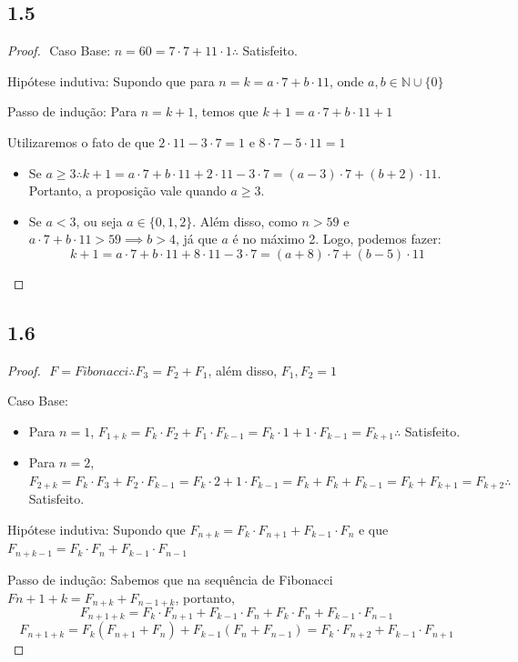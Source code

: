 \documentclass{article}
\begin{document}
\subsection*{1.5}
\begin{proof}
$ $\newline
Caso Base: $n = 60 = 7\cdot7 + 11\cdot1 \therefore$ Satisfeito. 

Hipótese indutiva: Supondo que para $n=k = a\cdot7 + b\cdot11$, onde $a,b \in \mathbb{N}\cup\{0\}$

Passo de indução: Para $n = k+1$, temos que $k+1 =a\cdot7 + b\cdot11 + 1$

Utilizaremos o fato de que $2\cdot11-3\cdot7 = 1$  e  $8\cdot7 - 5\cdot11 = 1$

\begin{itemize}

\item Se $a \geq  3 \therefore k + 1 =a\cdot7+b\cdot11+2\cdot11-3\cdot7 = (a-3)\cdot7 + (b+2)\cdot11$. Portanto,
a proposição vale quando $a \geq 3 $.

\item Se $a<3$, ou seja $a \in \{0,1,2\}$. Além disso, como $n > 59$ e $a\cdot7 + b\cdot11 > 59 \implies b > 4$, já que $a$ é no máximo 2.
Logo, podemos fazer:
$$k+1 =a\cdot7+b\cdot11+8\cdot11-3\cdot7 = (a+8)\cdot7 + (b-5)\cdot11 $$

\end{itemize}
\end{proof}

\subsection*{1.6}
\begin{proof}
$ $\newline
$F = Fibonacci \therefore F_3 = F_2 + F_1$, além disso, $F_1,F_2 = 1$

Caso Base:
\begin{itemize}
\item Para $n=1$, $F_{1+k}=F_k\cdot F_2+F_1\cdot F_{k-1}=F_k\cdot1+1\cdot F_{k-1} = F_{k+1} \therefore$ Satisfeito.

\item Para $n=2$, $F_{2+k}=F_k\cdot F_3+F_2\cdot F_{k-1}=F_k\cdot2+1\cdot F_{k-1} = F_k + F_k + F_{k-1} = F_k + F_{k+1} =F_{k+2} \therefore$ Satisfeito.
\end{itemize}

Hipótese indutiva: Supondo que $F_{n+k} = F_k \cdot F_{n+1} + F_{k-1} \cdot F_n$ e que $F_{n+k-1} = F_k \cdot F_{n} + F_{k-1} \cdot F_{n-1}$

Passo de indução: Sabemos que na sequência de Fibonacci $F{n+1+k} = F_{n+k} + F_{n-1+k}$, portanto,
$$F_{n+1+k} = F_k \cdot F_{n+1} + F_{k-1} \cdot F_n + F_k \cdot F_{n} + F_{k-1} \cdot F_{n-1}$$
$$F_{n+1+k} = F_k(F_{n+1}+F_{n})+F_{k-1}(F_n + F_{n-1}) = F_k\cdot F_{n+2}+F_{k-1}\cdot F_{n+1}$$

\end{proof}
\end{document}
